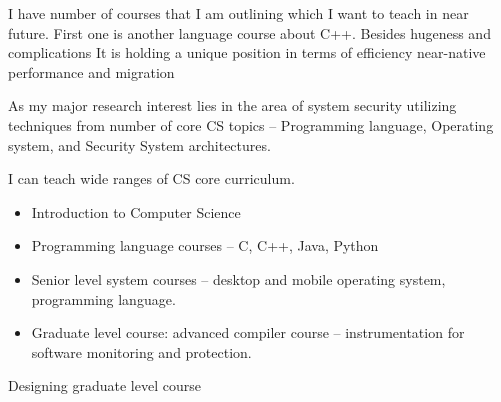 \documentclass[letterpaper, 10pt]{article}
\begin{document}
\begin{small}
I have number of courses that I am outlining which I want to teach in near
future. First one is another language course about C++. Besides hugeness and
complications  It is holding a unique position in terms of efficiency
near-native performance and migration 

As my major research interest lies in the area of system security utilizing 
techniques from number of core CS topics -- Programming language, Operating
system, and Security System architectures.


I can teach wide ranges of CS core curriculum.
\begin{itemize}
\item Introduction to Computer Science
\item Programming language courses -- C, C++, Java, Python 
\item Senior level system courses -- desktop and mobile operating system,
  programming language.
\item Graduate level course: advanced compiler course -- instrumentation for
  software monitoring and protection.
\end{itemize}

Designing graduate level course 

\end{small}
\end{document}
